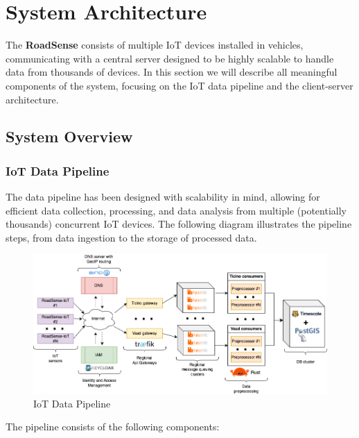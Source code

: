 \section{System Architecture}

The \textbf{RoadSense} consists of multiple IoT devices installed in vehicles, communicating with a central server designed to be highly scalable to handle data from thousands of devices. In this section we will describe all meaningful components of the system, focusing on the IoT data pipeline and the client-server architecture.

\subsection{System Overview}

\subsubsection{IoT Data Pipeline}

The data pipeline has been designed with scalability in mind, allowing for efficient data collection, processing, and data analysis from multiple (potentially thousands) concurrent IoT devices. The following diagram illustrates the pipeline steps, from data ingestion to the storage of processed data.

\begin{figure}[H]
	\centering
	\includegraphics[width=\textwidth]{../../assets/diagrams/iot_data_pipeline/iot_data_pipeline.png}
	\caption{IoT Data Pipeline}
\end{figure}

The pipeline consists of the following components:

